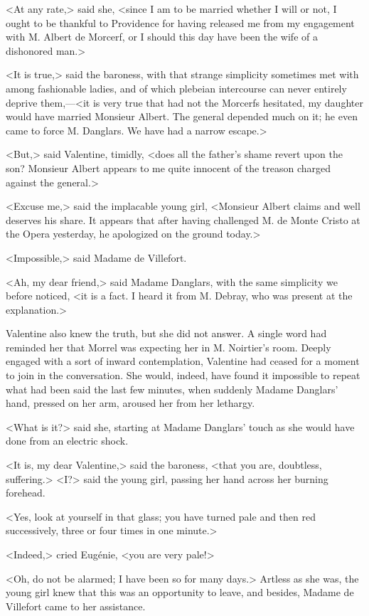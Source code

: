  <At any rate,> said she, <since I am to be married whether I will or not, I ought to be thankful to Providence for having released me from my engagement with M. Albert de Morcerf, or I should this day have been the wife of a dishonored man.> 

 <It is true,> said the baroness, with that strange simplicity sometimes met with among fashionable ladies, and of which plebeian intercourse can never entirely deprive them,—<it is very true that had not the Morcerfs hesitated, my daughter would have married Monsieur Albert. The general depended much on it; he even came to force M. Danglars. We have had a narrow escape.> 

 <But,> said Valentine, timidly, <does all the father's shame revert upon the son? Monsieur Albert appears to me quite innocent of the treason charged against the general.> 

 <Excuse me,> said the implacable young girl, <Monsieur Albert claims and well deserves his share. It appears that after having challenged M. de Monte Cristo at the Opera yesterday, he apologized on the ground today.> 

 <Impossible,> said Madame de Villefort. 

 <Ah, my dear friend,> said Madame Danglars, with the same simplicity we before noticed, <it is a fact. I heard it from M. Debray, who was present at the explanation.> 

 Valentine also knew the truth, but she did not answer. A single word had reminded her that Morrel was expecting her in M. Noirtier's room. Deeply engaged with a sort of inward contemplation, Valentine had ceased for a moment to join in the conversation. She would, indeed, have found it impossible to repeat what had been said the last few minutes, when suddenly Madame Danglars' hand, pressed on her arm, aroused her from her lethargy. 

 <What is it?> said she, starting at Madame Danglars' touch as she would have done from an electric shock. 

 <It is, my dear Valentine,> said the baroness, <that you are, doubtless, suffering.>  <I?> said the young girl, passing her hand across her burning forehead. 

 <Yes, look at yourself in that glass; you have turned pale and then red successively, three or four times in one minute.> 

 <Indeed,> cried Eugénie, <you are very pale!> 

 <Oh, do not be alarmed; I have been so for many days.> Artless as she was, the young girl knew that this was an opportunity to leave, and besides, Madame de Villefort came to her assistance. 

